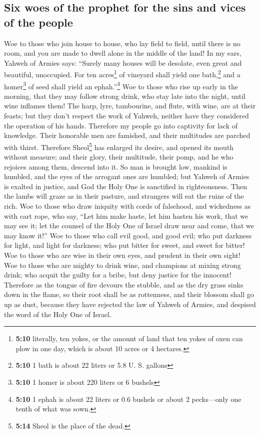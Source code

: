 \hypertarget{six-woes-of-the-prophet-for-the-sins-and-vices-of-the-people}{%
\subsection{Six woes of the prophet for the sins and vices of the
people}\label{six-woes-of-the-prophet-for-the-sins-and-vices-of-the-people}}

 Woe to those who join house to house, who lay field to
field, until there is no room, and you are made to dwell alone in the
middle of the land!  In my ears, Yahweh of Armies says:
``Surely many houses will be desolate, even great and beautiful,
unoccupied.  For ten acres\footnote{\textbf{5:10}
  literally, ten yokes, or the amount of land that ten yokes of oxen can
  plow in one day, which is about 10 acres or 4 hectares.} of vineyard
shall yield one bath,\footnote{\textbf{5:10} 1 bath is about 22 liters
  or 5.8 U. S. gallons} and a homer\footnote{\textbf{5:10} 1 homer is
  about 220 liters or 6 bushels} of seed shall yield an
ephah.''\footnote{\textbf{5:10} 1 ephah is about 22 liters or 0.6
  bushels or about 2 pecks---only one tenth of what was sown.}
 Woe to those who rise up early in the morning, that they
may follow strong drink, who stay late into the night, until wine
inflames them!  The harp, lyre, tambourine, and flute,
with wine, are at their feasts; but they don't respect the work of
Yahweh, neither have they considered the operation of his hands.
 Therefore my people go into captivity for lack of
knowledge. Their honorable men are famished, and their multitudes are
parched with thirst.  Therefore Sheol\footnote{\textbf{5:14}
  Sheol is the place of the dead.} has enlarged its desire, and opened
its mouth without measure; and their glory, their multitude, their pomp,
and he who rejoices among them, descend into it.  So man
is brought low, mankind is humbled, and the eyes of the arrogant ones
are humbled;  but Yahweh of Armies is exalted in justice,
and God the Holy One is sanctified in righteousness. 
Then the lambs will graze as in their pasture, and strangers will eat
the ruins of the rich.  Woe to those who draw iniquity
with cords of falsehood, and wickedness as with cart rope,
 who say, ``Let him make haste, let him hasten his work,
that we may see it; let the counsel of the Holy One of Israel draw near
and come, that we may know it!''  Woe to those who call
evil good, and good evil; who put darkness for light, and light for
darkness; who put bitter for sweet, and sweet for bitter!
 Woe to those who are wise in their own eyes, and prudent
in their own sight!  Woe to those who are mighty to drink
wine, and champions at mixing strong drink;  who acquit
the guilty for a bribe, but deny justice for the innocent!
 Therefore as the tongue of fire devours the stubble, and
as the dry grass sinks down in the flame, so their root shall be as
rottenness, and their blossom shall go up as dust, because they have
rejected the law of Yahweh of Armies, and despised the word of the Holy
One of Israel.

